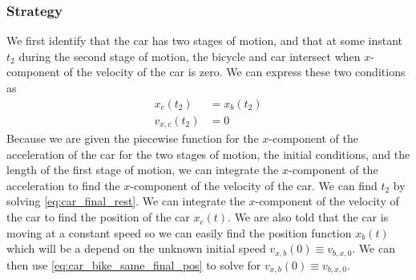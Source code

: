 \documentclass[solutions]{esg8012exam}
\begin{document}
  \subsubsection{Strategy}
    We first identify that the car has two stages of motion, and that at some instant $t_2$ during the second stage of motion, the bicycle and car intersect when $x$-component of the velocity of the car is zero. We can express these two conditions as
    \begin{align}
      x_c(t_2) & = x_b(t_2) \label{eq:car_bike_same_final_pos}\\
      v_{x,c}(t_2) & = 0 \label{eq:car_final_rest}
    \end{align}
    Because we are given the piecewise function for the $x$-component of the acceleration of the car for the two stages of motion, the initial conditions, and the length of the first stage of motion, we can integrate the $x$-component of the acceleration to find the $x$-component of the velocity of the car.  We can find $t_2$ by solving \autoref{eq:car_final_rest}.  We can integrate the $x$-component of the velocity of the car to find the position of the car $x_c(t)$.  We are also told that the car is moving at a constant speed so we can easily find the position function $x_b(t)$ which will be a depend on the unknown initial speed $v_{x,b}(0) \equiv v_{b,x,0}$.  We can then use \autoref{eq:car_bike_same_final_pos} to solve for $v_{x,b}(0) \equiv v_{b,x,0}$.
\end{document}
